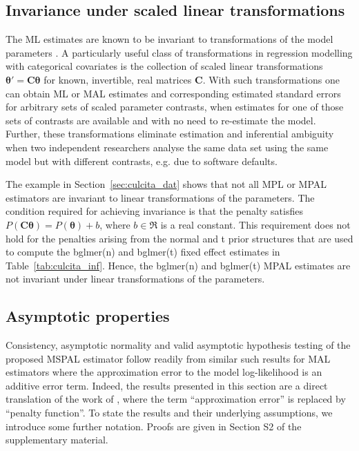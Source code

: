 \documentclass[11pt, a4paper]{article}
\newcommand*{\bb}{\boldsymbol}
\theoremstyle{example} \newtheorem{example}{Example}[section]
\theoremstyle{theorem} \newtheorem{theorem}{Theorem}[section]
\def\btheta{\bb{\theta}}
\def\bC{\bb{C}}
\begin{document}
\subsection{Invariance under scaled linear transformations}

The ML estimates are known to be invariant to transformations of the
model parameters \citep[see, for example][]{zehna:1966}. A
particularly useful class of transformations in regression modelling
with categorical covariates is the collection of scaled linear transformations
$\btheta' = \bC \btheta$ for known, invertible, real matrices
$\bC$. With such transformations one can obtain ML or MAL estimates and corresponding
estimated standard errors for arbitrary sets of scaled parameter
contrasts, when estimates for one of those sets of contrasts are
available and with no need to re-estimate the model. Further, these transformations eliminate estimation and
inferential ambiguity when two independent researchers analyse the
same data set using the same model but with different contrasts,
e.g. due to software defaults.

The example in Section~\ref{sec:culcita_dat} shows that not all MPL or
MPAL estimators are invariant to linear transformations of the
parameters. The condition required for achieving invariance is that
the penalty satisfies $P(\bC\btheta) = P(\btheta) + b$, where
$b \in \Re$ is a real constant. This requirement does not hold for
the penalties arising from the normal and t prior structures that are
used to compute the bglmer(n) and bglmer(t) fixed effect estimates in Table~\ref{tab:culcita_inf}. Hence, the bglmer(n) and
bglmer(t) MPAL estimates are not invariant under linear
transformations of the parameters.

\subsection{Asymptotic properties}
\label{sec:ass+res}

Consistency, asymptotic normality and valid asymptotic hypothesis testing of the proposed MSPAL estimator follow readily from similar such results for MAL estimators where the approximation error to the model log-likelihood is an additive error term. Indeed, the results presented in this section are a direct translation of the work of \citet{ogden2017asymptotic}, where the term ``approximation error'' is replaced by ``penalty function''. To state the results and their underlying assumptions, we introduce some further notation. Proofs are given in Section S2 of the supplementary material.
\end{document}
